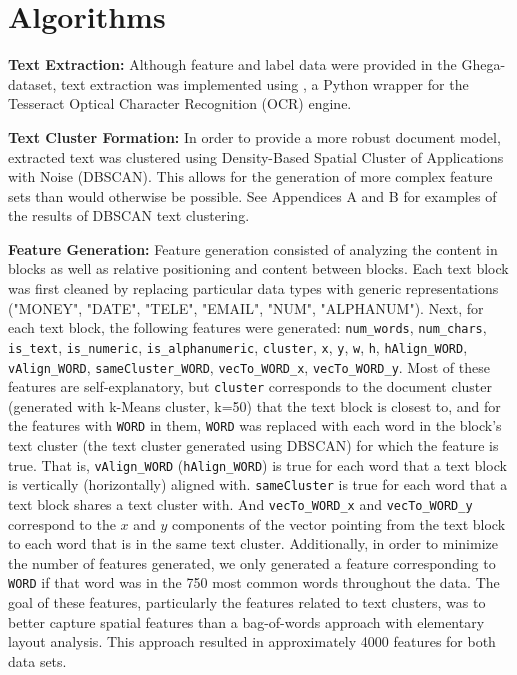 \documentclass[twoside,11pt]{article}
\renewcommand{\>}{{\rightarrow}}
\newcommand{\1}{{\mathbf 1}}
\newcommand{\0}{{\mathbf 0}}
\begin{document}

\section{Algorithms}
\textbf{Text Extraction:} Although feature and label data were provided in the Ghega-dataset, text extraction was implemented using , a Python wrapper for the Tesseract Optical Character Recognition (OCR) engine.

\textbf{Text Cluster Formation:} In order to provide a more robust document model, extracted text was clustered using Density-Based Spatial Cluster of Applications with Noise (DBSCAN). This allows for the generation of more complex feature sets than would otherwise be possible. See Appendices A and B for examples of the results of DBSCAN text clustering.

\textbf{Feature Generation:} Feature generation consisted of analyzing the content in blocks as well as relative positioning and content between blocks. Each text block was first cleaned by replacing particular data types with generic representations ("MONEY", "DATE", "TELE", "EMAIL", "NUM", "ALPHANUM"). Next, for each text block, the following features were generated: \texttt{num\_words}, \texttt{num\_chars}, \texttt{is\_text}, \texttt{is\_numeric}, \texttt{is\_alphanumeric}, \texttt{cluster}, \texttt{x}, \texttt{y}, \texttt{w}, \texttt{h}, \texttt{hAlign\_WORD}, \texttt{vAlign\_WORD}, \texttt{sameCluster\_WORD}, \texttt{vecTo\_WORD\_x}, \texttt{vecTo\_WORD\_y}. Most of these features are self-explanatory, but \texttt{cluster} corresponds to the document cluster (generated with k-Means cluster, k=50) that the text block is closest to, and for the features with \texttt{WORD} in them, \texttt{WORD} was replaced with each word in the block's text cluster (the text cluster generated using DBSCAN) for which the feature is true. That is, \texttt{vAlign\_WORD} (\texttt{hAlign\_WORD}) is true for each word that a text block is vertically (horizontally) aligned with. \texttt{sameCluster} is true for each word that a text block shares a text cluster with. And \texttt{vecTo\_WORD\_x} and \texttt{vecTo\_WORD\_y} correspond to the $x$ and $y$ components of the vector pointing from the text block to each word that is in the same text cluster. Additionally, in order to minimize the number of features generated, we only generated a feature corresponding to \texttt{WORD} if that word was in the 750 most common words throughout the data. The goal of these features, particularly the features related to text clusters, was to better capture spatial features than a bag-of-words approach with elementary layout analysis. This approach resulted in approximately 4000 features for both data sets.
\end{document}
